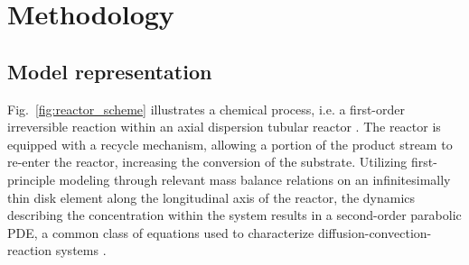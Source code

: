 \section{Methodology}

\subsection{Model representation}

Fig.~\ref{fig:reactor_scheme} illustrates a chemical process, i.e. a first-order irreversible reaction within an axial dispersion tubular reactor \cite{levenspiel1998chemical}. The reactor is equipped with a recycle mechanism, allowing a portion of the product stream to re-enter the reactor, increasing the conversion of the substrate.  Utilizing first-principle modeling through relevant mass balance relations on an infinitesimally thin disk element along the longitudinal axis of the reactor, the dynamics describing the concentration within the system results in a second-order parabolic PDE, a common class of equations used to characterize diffusion-convection-reaction systems \cite{jensen1982bifurcation}. 

